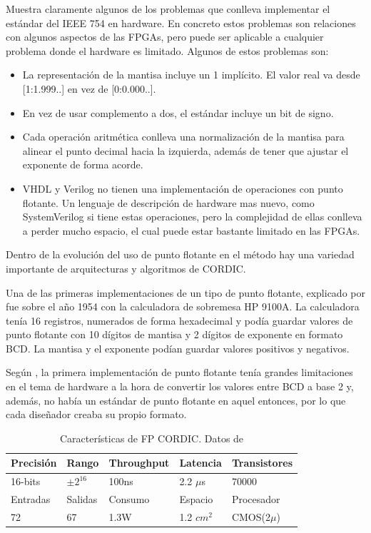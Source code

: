 \cite{parker_abstract_2011} Muestra claramente algunos de los problemas que conlleva implementar el estándar del IEEE 754 en hardware. En concreto estos problemas son relaciones con algunos aspectos de las FPGAs, pero puede ser aplicable a cualquier problema donde el hardware es limitado. Algunos de estos problemas son:

\begin{itemize}
	\item La representación de la mantisa incluye un 1 implícito. El valor real va desde [1:1.999..] en vez de [0:0.000..]. 
	\item En vez de usar complemento a dos, el estándar incluye un bit de signo.
	\item Cada operación aritmética conlleva una normalización de la mantisa para alinear el punto decimal hacia la izquierda, además de tener que ajustar el exponente de forma acorde.
	\item VHDL y Verilog no tienen una implementación de operaciones con punto flotante. Un lenguaje de descripción de hardware mas nuevo, como SystemVerilog si tiene estas operaciones, pero la complejidad de ellas conlleva a perder mucho espacio, el cual puede estar bastante limitado en las FPGAs.
\end{itemize}

Dentro de la evolución del uso de punto flotante en el método hay una variedad importante de arquitecturas y algoritmos de CORDIC.

Una de las primeras implementaciones de un tipo de punto flotante, explicado por \cite{leibson_9100_2005} fue sobre el año 1954 con la calculadora de sobremesa HP 9100A. La calculadora tenía 16 registros, numerados de forma hexadecimal y podía guardar valores de punto flotante con 10 dígitos de mantisa y 2 dígitos de exponente en formato BCD. La mantisa y el exponente podían guardar valores positivos y negativos.

Según \cite{walther_unified_1971}, la primera implementación de punto flotante tenía grandes limitaciones en el tema de hardware a la hora de convertir los valores entre BCD a base 2 y, además, no había un estándar de punto flotante en aquel entonces, por lo que cada diseñador creaba su propio formato.

\begin{table}[]
	\centering
	\begin{tabular}{|l|l|l|l|l|}
	\hline
		Precisión & Rango                 & Throughput & Latencia                  & Transistores \\ \hline
		16-bits   & $\pm2^{16}$ & 100ns      & 2.2 $\mu$s                     & 70000        \\
\hline
		Entradas  & Salidas               & Consumo    & Espacio                   & Procesador   \\ \hline
		72        & 67                    & 1.3W       & 1.2 $cm^2$ & CMOS(2$\mu$) \\ \hline   
	\end{tabular}
	\caption{Características de FP CORDIC. Datos de \cite{de_lange_optimal_1988}}
	\label{table:FP_CORDIC_feature}
\end{table}

